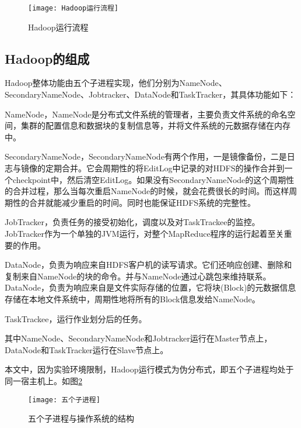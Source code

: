\begin{figure}
 \centering
 \texttt{[image: Hadoop运行流程]}
 \caption{Hadoop运行流程}
 \label{fig:Hadoop运行流程}
\end{figure}

\subsection{Hadoop的组成}
Hadoop整体功能由五个子进程实现，他们分别为NameNode、SecondaryNameNode、Jobtracker、DataNode和TaskTracker，其具体功能如下：

NameNode，NameNode是分布式文件系统的管理者，主要负责文件系统的命名空间，集群的配置信息和数据块的复制信息等，并将文件系统的元数据存储在内存中。

SecondaryNameNode，SecondaryNameNode有两个作用，一是镜像备份，二是日志与镜像的定期合并。它会周期性的将EditLog中记录的对HDFS的操作合并到一个checkpoint中，然后清空EditLog。如果没有SecondaryNameNode的这个周期性的合并过程，那么当每次重启NameNode的时候，就会花费很长的时间。而这样周期性的合并就能减少重启的时间。同时也能保证HDFS系统的完整性。

JobTracker，负责任务的接受初始化，调度以及对TaskTrackee的监控。JobTracker作为一个单独的JVM运行，对整个MapReduce程序的运行起着至关重要的作用。

DataNode，负责为响应来自HDFS客户机的读写请求。它们还响应创建、删除和复制来自NameNode的块的命令。并与NameNode通过心跳包来维持联系。DataNode，负责为响应来自是文件实际存储的位置，它将块(Block)的元数据信息存储在本地文件系统中，周期性地将所有的Block信息发给NameNode。

TaskTrackee，运行作业划分后的任务。

其中NameNode、SecondaryNameNode和Jobtracker运行在Master节点上，DataNode和TaskTracker运行在Slave节点上。

本文中，因为实验环境限制，Hadoop运行模式为伪分布式，即五个子进程均处于同一宿主机上。如图\ref{fig:五个子进程}

\begin{figure}[h]
 \centering
 \texttt{[image: 五个子进程]}
 \caption{五个子进程与操作系统的结构}
 \label{fig:五个子进程}
\end{figure}


